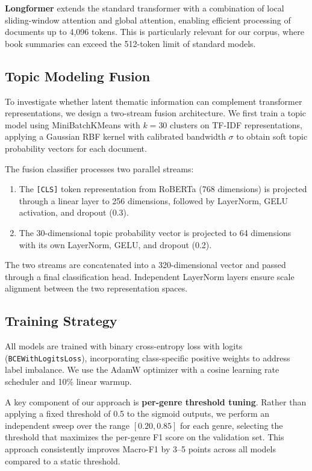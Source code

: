 \documentclass[11pt,a4paper]{article}
\begin{document}
\textbf{Longformer} \cite{beltagy2020} extends the standard transformer with a combination of local sliding-window attention and global attention, enabling efficient processing of documents up to 4,096 tokens. This is particularly relevant for our corpus, where book summaries can exceed the 512-token limit of standard models.

\subsection{Topic Modeling Fusion}

To investigate whether latent thematic information can complement transformer representations, we design a two-stream fusion architecture. We first train a topic model using MiniBatchKMeans with $k=30$ clusters on TF-IDF representations, applying a Gaussian RBF kernel with calibrated bandwidth $\sigma$ to obtain soft topic probability vectors for each document.

The fusion classifier processes two parallel streams:
\begin{enumerate}[nosep]
    \item The \texttt{[CLS]} token representation from RoBERTa (768 dimensions) is projected through a linear layer to 256 dimensions, followed by LayerNorm, GELU activation, and dropout (0.3).
    \item The 30-dimensional topic probability vector is projected to 64 dimensions with its own LayerNorm, GELU, and dropout (0.2).
\end{enumerate}
The two streams are concatenated into a 320-dimensional vector and passed through a final classification head. Independent LayerNorm layers ensure scale alignment between the two representation spaces.

\subsection{Training Strategy}

All models are trained with binary cross-entropy loss with logits (\texttt{BCEWithLogitsLoss}), incorporating class-specific positive weights to address label imbalance. We use the AdamW optimizer with a cosine learning rate scheduler and 10\% linear warmup.

A key component of our approach is \textbf{per-genre threshold tuning}. Rather than applying a fixed threshold of 0.5 to the sigmoid outputs, we perform an independent sweep over the range $[0.20, 0.85]$ for each genre, selecting the threshold that maximizes the per-genre F1 score on the validation set. This approach consistently improves Macro-F1 by 3--5 points across all models compared to a static threshold.
\end{document}
